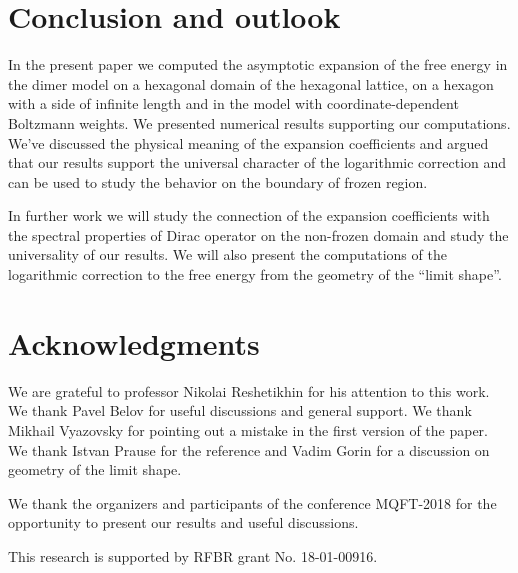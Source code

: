 \documentclass{article}
\begin{document}
\section*{Conclusion and outlook}
\label{sec:conclusion}

In the present paper we computed the asymptotic expansion of the free energy in the dimer model on a
hexagonal domain of the hexagonal lattice, on a hexagon with a side of infinite length and in the
model with coordinate-dependent Boltzmann weights. We presented numerical results supporting our
computations. We've discussed the physical meaning of the expansion coefficients and argued that our
results support the universal character of the logarithmic correction and can be used to study the
behavior on the boundary of frozen region.

In further work we will study the connection of the expansion coefficients with the spectral
properties of Dirac operator on the non-frozen domain and study the universality of our results. We
will also present the computations of the logarithmic correction to the free energy from the
geometry of the ``limit shape''.

\section*{Acknowledgments}
\label{sec:acknowledgements}
We are grateful to professor Nikolai Reshetikhin for his attention to
this work. We thank Pavel Belov for useful discussions and general
support. We thank Mikhail Vyazovsky for pointing out a mistake in the
first version of the paper. We thank Istvan Prause for the reference
\cite{allegra2015exact} and Vadim Gorin for a discussion on geometry
of the limit shape.

We thank the organizers and participants of the conference MQFT-2018
for the opportunity to present our results and useful discussions.

This research is supported by RFBR grant No. 18-01-00916.


{} 
\end{document}
